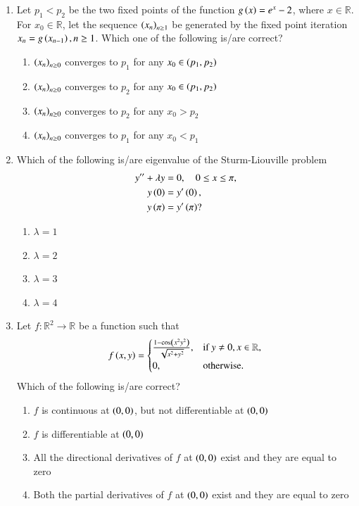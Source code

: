 \documentclass[journal,12pt,onecolumn]{IEEEtran}
\theoremstyle{remark}
\begin{document}
\begin{enumerate}
\item Let $p_1 < p_2$ be the two fixed points of the function $g\left(x\right) = e^x - 2$, where $x \in \mathbb{R}$. For $x_0 \in \mathbb{R}$, let the sequence $\left(x_n\right)_{n \ge 1}$ be generated by the fixed point iteration $x_n = g\left(x_{n-1}\right), n \ge 1$. Which one of the following is/are correct? \hfill{}
\begin{enumerate}
    \item $\left(x_n\right)_{n\ge 0}$ converges to $p_1$ for any $x_0 \in \left(p_1, p_2\right)$
    \item $\left(x_n\right)_{n\ge 0}$ converges to $p_2$ for any $x_0 \in \left(p_1, p_2\right)$
    \item $\left(x_n\right)_{n\ge 0}$ converges to $p_2$ for any $x_0 > p_2$
    \item $\left(x_n\right)_{n\ge 0}$ converges to $p_1$ for any $x_0 < p_1$
\end{enumerate}

\item Which of the following is/are eigenvalue of the Sturm-Liouville problem
\begin{align*}
    y'' + \lambda y &= 0, \quad 0 \le x \le \pi, \\
    y\left(0\right) &= y'\left(0\right), \\
    y\left(\pi\right) &= y'\left(\pi\right)?
\end{align*}
\hfill{}
\begin{enumerate}
    \item $\lambda = 1$
    \item $\lambda = 2$
    \item $\lambda = 3$
    \item $\lambda = 4$
\end{enumerate}

\item Let $f \colon \mathbb{R}^2 \to \mathbb{R}$ be a function such that
\[ f\left(x, y\right) = \begin{cases} \frac{1 - \cos\left(x^2y^2\right)}{\sqrt{x^2+y^2}}, & \text{if } y \neq 0, x \in \mathbb{R}, \\ 0, & \text{otherwise.} \end{cases} \]
Which of the following is/are correct? \hfill{}
\begin{enumerate}
    \item $f$ is continuous at $\left(0, 0\right)$, but not differentiable at $\left(0, 0\right)$
    \item $f$ is differentiable at $\left(0, 0\right)$
    \item All the directional derivatives of $f$ at $\left(0, 0\right)$ exist and they are equal to zero
    \item Both the partial derivatives of $f$ at $\left(0, 0\right)$ exist and they are equal to zero
\end{enumerate}


\end{enumerate}
\end{document}
